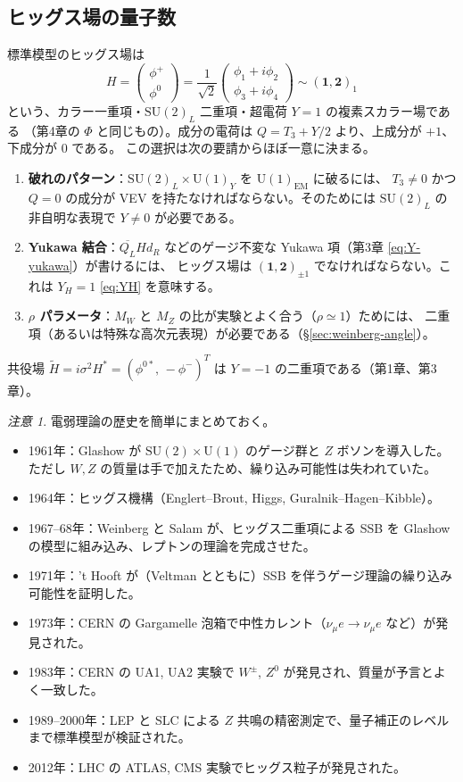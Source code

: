 \documentclass[uplatex,dvipdfmx,a4paper,11pt,openany]{jsbook}
\numberwithin{equation}{chapter}
\theoremstyle{definition}
\theoremstyle{plain}
\theoremstyle{remark}
\newtheorem{remark}{注意}[chapter]
\newcommand{\SU}{\mathrm{SU}}
\newcommand{\U}{\mathrm{U}}
\begin{document}
\subsection{ヒッグス場の量子数}
標準模型のヒッグス場は
\begin{equation}
H=\begin{pmatrix}\phi^+\\ \phi^0\end{pmatrix}
=\frac{1}{\sqrt2}\begin{pmatrix}\phi_1+i\phi_2\\ \phi_3+i\phi_4\end{pmatrix}
\sim(\mathbf1,\mathbf2)_{1}
\label{eq:H-doublet}
\end{equation}
という、カラー一重項・$\SU(2)_L$ 二重項・超電荷 $Y=1$ の複素スカラー場である
（第4章の $\Phi$ と同じもの）。成分の電荷は $Q=T_3+Y/2$ より、上成分が $+1$、下成分が $0$ である。
この選択は次の要請からほぼ一意に決まる。
\begin{enumerate}
    \item \textbf{破れのパターン}：$\SU(2)_L\times\U(1)_Y$ を $\U(1)_{\mathrm{EM}}$ に破るには、
    $T_3\ne0$ かつ $Q=0$ の成分が VEV を持たなければならない。そのためには $\SU(2)_L$ の非自明な表現で $Y\ne0$ が必要である。
    \item \textbf{Yukawa 結合}：$\overline{Q_L}Hd_R$ などのゲージ不変な Yukawa 項（第3章 \eqref{eq:Y-yukawa}）が書けるには、
    ヒッグス場は $(\mathbf1,\mathbf2)_{\pm1}$ でなければならない。これは $Y_H=1$ \eqref{eq:YH} を意味する。
    \item \textbf{$\rho$ パラメータ}：$M_W$ と $M_Z$ の比が実験とよく合う（$\rho\simeq1$）ためには、
    二重項（あるいは特殊な高次元表現）が必要である（\S\ref{sec:weinberg-angle}）。
\end{enumerate}
共役場 $\tilde H=i\sigma^2H^*=(\phi^{0*},\,-\phi^-)^T$ は $Y=-1$ の二重項である（第1章、第3章）。
\begin{remark}
電弱理論の歴史を簡単にまとめておく。
\begin{itemize}
    \item 1961年：Glashow が $\SU(2)\times\U(1)$ のゲージ群と $Z$ ボソンを導入した。ただし $W,Z$ の質量は手で加えたため、繰り込み可能性は失われていた。
    \item 1964年：ヒッグス機構（Englert--Brout, Higgs, Guralnik--Hagen--Kibble）。
    \item 1967--68年：Weinberg と Salam が、ヒッグス二重項による SSB を Glashow の模型に組み込み、レプトンの理論を完成させた。
    \item 1971年：'t Hooft が（Veltman とともに）SSB を伴うゲージ理論の繰り込み可能性を証明した。
    \item 1973年：CERN の Gargamelle 泡箱で中性カレント（$\nu_\mu e\to\nu_\mu e$ など）が発見された。
    \item 1983年：CERN の UA1, UA2 実験で $W^\pm$, $Z^0$ が発見され、質量が予言とよく一致した。
    \item 1989--2000年：LEP と SLC による $Z$ 共鳴の精密測定で、量子補正のレベルまで標準模型が検証された。
    \item 2012年：LHC の ATLAS, CMS 実験でヒッグス粒子が発見された。
\end{itemize}
\end{remark}
\end{document}
